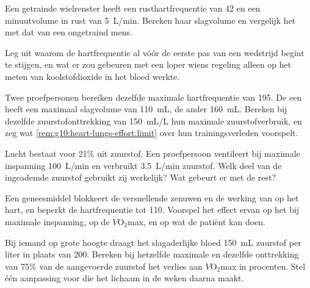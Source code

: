 \begin{exercise}[$\star\star$]\label{exo:g10:heart-lungs-effort:10}
Een getrainde wielrenster heeft een rusthartfrequentie van 42 en een
minuutvolume in rust van \qty{5}{L/min}. Bereken haar slagvolume en
vergelijk het met dat van een ongetraind mens.
\end{exercise}

\begin{exercise}[$\star\star$]\label{exo:g10:heart-lungs-effort:11}
Leg uit waarom de hartfrequentie al vóór de eerste pas van een wedstrijd
begint te stijgen, en wat er zou gebeuren met een loper wiens regeling
alleen op het meten van koolstofdioxide in het bloed werkte.
\end{exercise}

\begin{exercise}[$\star\star\star$]\label{exo:g10:heart-lungs-effort:12}
Twee proefpersonen bereiken dezelfde maximale hartfrequentie van 195. De
een heeft een maximaal slagvolume van \qty{110}{mL}, de ander
\qty{160}{mL}. Bereken bij dezelfde zuurstofonttrekking van
\qty{150}{mL/L} hun maximale zuurstofverbruik, en zeg wat
\cref{rem:g10:heart-lungs-effort:limit} over hun trainingsverleden
voorspelt.
\end{exercise}

\begin{exercise}[$\star\star\star$]\label{exo:g10:heart-lungs-effort:13}
Lucht bestaat voor 21\% uit zuurstof. Een proefpersoon ventileert bij
maximale inspanning \qty{100}{L/min} en verbruikt \qty{3.5}{L/min}
zuurstof. Welk deel van de ingeademde zuurstof gebruikt zij werkelijk?
Wat gebeurt er met de rest?
\end{exercise}

\begin{exercise}[$\star\star\star$]\label{exo:g10:heart-lungs-effort:14}
Een geneesmiddel blokkeert de versnellende zenuwen en de werking van
 op het hart, en beperkt de hartfrequentie tot 110. Voorspel
het effect ervan op het  bij maximale inspanning, op de
$\dot V\!\mathrm{O_2}$max, en op wat de patiënt kan doen.
\end{exercise}

\begin{exercise}[$\star\star\star$]\label{exo:g10:heart-lungs-effort:15}
Bij iemand op grote hoogte draagt het slagaderlijke bloed \qty{150}{mL}
zuurstof per liter in plaats van \num{200}. Bereken bij hetzelfde
maximale  en dezelfde onttrekking van 75\% van de
aangevoerde zuurstof het verlies aan $\dot V\!\mathrm{O_2}$max in
procenten. Stel één aanpassing voor die het lichaam in de weken daarna
maakt.
\end{exercise}

